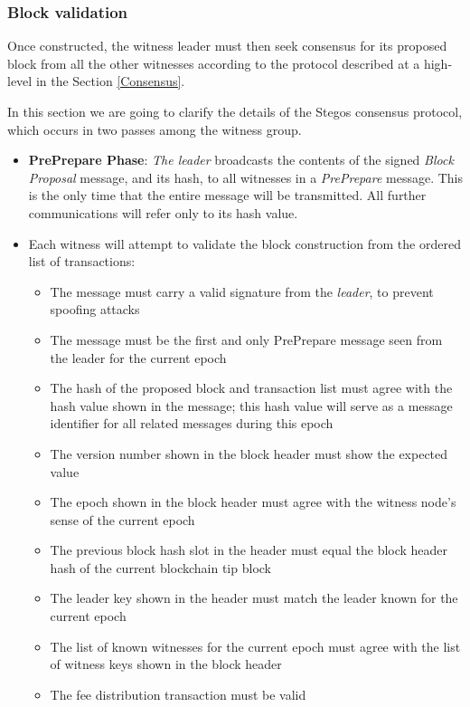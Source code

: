 \documentclass[a4paper, 10pt, conference]{ieeeconf}
\begin{document}
\subsubsection{Block validation} Once constructed, the witness leader must then seek consensus for its proposed block from all the other witnesses according to the protocol described at a high-level in the Section \ref{Consensus}. 

In this section we are going to clarify the details of the Stegos consensus protocol, which occurs in two passes among the witness group.

\begin{itemize}
	\item {\textbf{PrePrepare Phase}: \textit{The leader} broadcasts the contents of the signed \textit{Block Proposal} message, and its hash, to all witnesses in a \textit{PrePrepare} message. This is the only time that the entire message will be transmitted. All further communications will refer only to its hash value.}
	\item {Each witness will attempt to validate the block construction from the ordered list of transactions:
		\begin{itemize}
			\item {The message must carry a valid signature from the \textit{leader}, to prevent spoofing attacks}
			\item {The message must be the first and only PrePrepare message seen from the leader for the current epoch}
			\item {The hash of the proposed block and transaction list must agree with the hash value shown in the message; this hash value will serve as a message identifier for all related messages during this epoch}
			\item {The version number shown in the block header must show the expected value}
			\item {The epoch shown in the block header must agree with the witness node's sense of the current epoch}
			\item {The previous block hash slot in the header must equal the block header hash of the current blockchain tip block}
			\item {The leader key shown in the header must match the leader known for the current epoch}
			\item {The list of known witnesses for the current epoch must agree with the list of witness keys shown in the block header}
			\item {The fee distribution transaction must be valid}

\end{itemize}}
\end{itemize}
\end{document}
